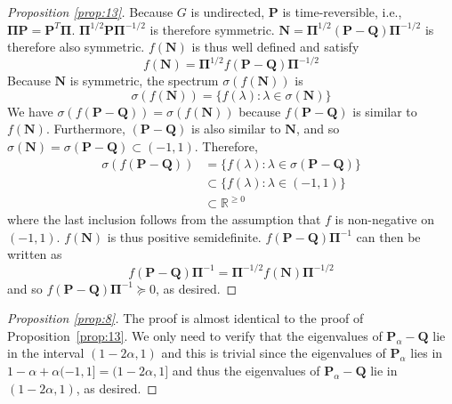 \documentclass[10pt,twocolumn]{article}
\numberwithin{equation}{section}
\begin{document}
\begin{proof}[Proposition \ref{prop:13}]
  Because $G$ is undirected, $\mathbf{P}$ is time-reversible,
  i.e., $\bm{\Pi}\mathbf{P} =
  \mathbf{P}^{T}\bm{\Pi}$. $\bm{\Pi}^{1/2}\mathbf{P}\bm{\Pi}^{-1/2}$
  is therefore symmetric. $\mathbf{N} =
  \bm{\Pi}^{1/2}(\mathbf{P} - \mathbf{Q})\bm{\Pi}^{-1/2}$ is
  therefore also symmetric. $f(\mathbf{N})$ is thus well defined and
  satisfy
  \begin{equation}
    \label{eq:66}
    f(\mathbf{N}) = \bm{\Pi}^{1/2}f(\mathbf{P} - \mathbf{Q})\bm{\Pi}^{-1/2}
  \end{equation}
  Because $\mathbf{N}$ is symmetric, the spectrum 
  $\sigma(f(\mathbf{N}))$ is
  \begin{equation}
    \label{eq:67}
    \sigma(f(\mathbf{N})) = \{ f(\lambda) \colon \lambda \in
    \sigma(\mathbf{N}) \}
  \end{equation}
  We have $\sigma(f(\mathbf{P} - \mathbf{Q})) = \sigma(f(\mathbf{N}))$
  because $f(\mathbf{P} - \mathbf{Q})$ is similar to
  $f(\mathbf{N})$. Furthermore, $(\mathbf{P} - \mathbf{Q})$ is also
  similar to $\mathbf{N}$, and so $\sigma(\mathbf{N}) =
  \sigma(\mathbf{P} - \mathbf{Q}) \subset (-1,1)$. Therefore,
  \begin{equation}
    \label{eq:68}
    \begin{split}
    \sigma(f(\mathbf{P} - \mathbf{Q})) &= \{ f(\lambda) \colon \lambda \in
    \sigma(\mathbf{P} - \mathbf{Q})\} \\ &\subset \{ f(\lambda) \colon
    \lambda \in (-1,1) \} \\
    &\subset \mathbb{R}^{\geq 0}
    \end{split}
  \end{equation}
  where the last inclusion follows from the assumption that $f$ is
  non-negative on $(-1,1)$. $f(\mathbf{N})$ is thus positive
  semidefinite. $f(\mathbf{P} - \mathbf{Q})\bm{\Pi}^{-1}$ can then be
  written as
  \begin{equation}
    \label{eq:69}
f(\mathbf{P} - \mathbf{Q})\bm{\Pi}^{-1} = \bm{\Pi}^{-1/2}
f(\mathbf{N}) \bm{\Pi}^{-1/2}
  \end{equation}
and so $f(\mathbf{P} - \mathbf{Q})\bm{\Pi}^{-1} \succeq
0$, as desired. 
\end{proof}
\begin{proof}[Proposition \ref{prop:8}]
  The proof is almost identical to the proof of Proposition~\ref{prop:13}. We
  only need to verify that the eigenvalues of $\mathbf{P}_{\alpha} - \mathbf{Q}$
  lie in the interval $(1 - 2\alpha, 1)$ and this is trivial since
  the eigenvalues of $\mathbf{P}_{\alpha}$ lies in $1 - \alpha +
  \alpha(-1,1] = (1 - 2\alpha, 1]$ and thus the eigenvalues of
  $\mathbf{P}_{\alpha} - \mathbf{Q}$ lie in $(1 - 2\alpha, 1)$, as desired.
\end{proof}
\end{document}
